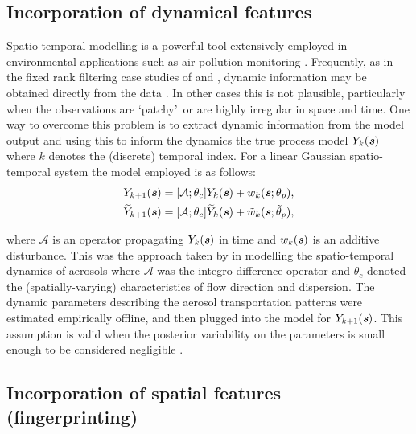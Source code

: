 \documentclass[10pt,a4paper]{article}
\newcommand{\svec} {\textbf{\textit{s}}}
\begin{document}
\subsection{Incorporation of dynamical features}\label{sec:dynamical}

Spatio-temporal modelling is a powerful tool extensively employed in environmental applications such as air pollution monitoring \citep{Cameletti_2013, Sahu_2005}. Frequently, as in the fixed rank filtering case studies of \cite{Cressie_2010} and \cite{Kang_2010}, dynamic information may be obtained directly from the data \citep[see also][]{Wikle_2002,Dewar_2009}. In other cases this is not plausible, particularly when the observations are \lq patchy\rq~or are highly irregular in space and time. One way to overcome this problem is to extract dynamic information from the model output and using this to inform the dynamics the true process model $Y_k(\svec)$ where $k$ denotes the (discrete) temporal index. For a linear Gaussian spatio-temporal system the model employed is as follows:
\begin{align}
Y_{k+1}(\svec) &= [\mathcal{A};\theta_c]Y_k(\svec) + w_k(\svec;\theta_p), \\
\widetilde{Y}_{k+1}(\svec) &= [\mathcal{A};\theta_c]\widetilde{Y}_{k}(\svec) + \tilde w_{k}(\svec;\tilde\theta_p), 
\end{align}

\noindent where $\mathcal{A}$ is an operator propagating $Y_k(\svec)$ in time and $w_k(\svec)$ is an additive disturbance. This was the approach taken by \cite{Calder_2011} in modelling the spatio-temporal dynamics of aerosols where $\mathcal{A}$ was the integro-difference operator \citep{Kot_1986} and $\theta_c$ denoted the (spatially-varying) characteristics of flow direction and dispersion. The dynamic parameters describing the aerosol transportation patterns were estimated empirically offline, and then plugged into the model for $Y_{k+1}(\svec)$. This assumption is valid when the posterior variability on the parameters is small enough to be considered negligible \citep{Zammit_2014b}.

\subsection{Incorporation of spatial features (fingerprinting)}
\end{document}
